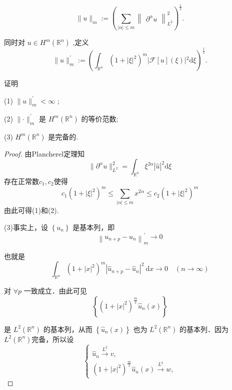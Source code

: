 \documentclass[lang=cn,newtx,10pt,scheme=chinese,thmcnt=chapter]{elegantbook}
\newcommand{\dif}{\mathrm{d}}
\begin{document}
\begin{problemset}
\begin{equation*}
\parallel u{\parallel }_{m} \mathrel{\text{ := }} {\left( \mathop{\sum }\limits_{{\left| \alpha \right|  \leqslant  m}}{\begin{Vmatrix}{\partial }^{\alpha }u\end{Vmatrix}}_{{L}^{2}}^{2}\right) }^{\frac{1}{2}}.
\end{equation*}

同时对 \(u \in  {H}^{m}\left( {\mathbb{R}}^{n}\right)\) ,定义
\begin{equation*}
\parallel u{\parallel }_{m}^{\prime } \mathrel{\text{ := }} {\left( {\int }_{{\mathbb{R}}^{n}}{\left( 1 + {\left| \xi \right| }^{2}\right) }^{m}\left| \mathcal{F}\left\lbrack  u\right\rbrack  \left( \xi \right) \right| {}^{2}\dif\xi \right) }^{\frac{1}{2}}.
\end{equation*}

证明

(1) \(\parallel u{\parallel }_{m}^{\prime } < \infty\) ;

(2) \(\parallel  \cdot  {\parallel }_{m}^{\prime }\) 是 \({H}^{m}\left( {\mathbb{R}}^{n}\right)\) 的等价范数;

(3) \({H}^{m}\left( {\mathbb{R}}^{n}\right)\) 是完备的.
\begin{proof}
    由Plancherel定理知\[
\|\partial^\alpha  u\|_{L^2}^2= \int_{\mathbb{R}^n} \xi ^{2\alpha} |\hat{u}|^2\dif \xi
    \]
存在正常数$c_1,c_2$使得
\[
c_1\left( 1 + {\left| \xi \right| }^{2}\right)^{m}\leqslant \sum\limits_{|\alpha|\leqslant m} x^{2\alpha}\leqslant c_2\left( 1 + {\left| \xi \right| }^{2}\right)^m
\]
由此可得(1)和(2).

(3)事实上，设 $\left\{u_n\right\}$ 是基本列，即
$$
\left\|u_{n+p}-u_n\right\|_m^{\prime} \rightarrow 0
$$


也就是
$$
\int_{\mathbb{R}^n}\left(1+|x|^2\right)^m\left|\hat{u}_{n+p}-\hat{u}_n\right|^2 \mathrm{~d} x \rightarrow 0 \quad(n \rightarrow \infty)
$$


对 $\forall p$ 一致成立．由此可见
$$
\left\{\left(1+|x|^2\right)^{\frac{m}{2}} \hat{u}_n(x)\right\}
$$


是 $L^2\left(\mathbb{R}^n\right)$ 的基本列，从而 $\left\{\hat{u}_n(x)\right\}$ 也为 $L^2\left(\mathbb{R}^n\right)$ 的基本列．因为 $L^2\left(\mathbb{R}^n\right)$完备，所以设
$$
\left\{\begin{array}{l}
\hat{u}_n \xrightarrow{L^2} v, \\
\left(1+|x|^2\right)^{\frac{m}{2}} \hat{u}_n(x) \xrightarrow{L^2} w,
\end{array}\right.
$$



\end{proof}
\end{problemset}
\end{document}
